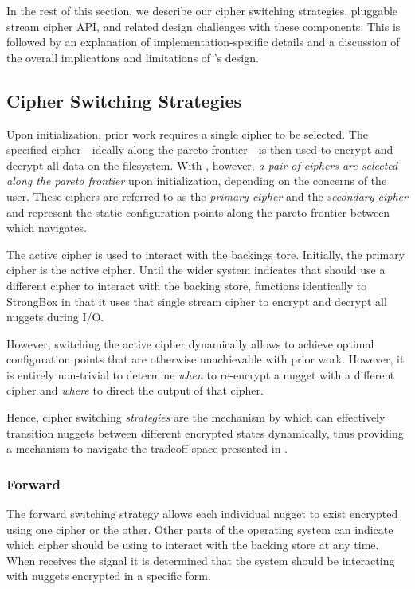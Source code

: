 In the rest of this section, we describe our cipher switching strategies,
pluggable stream cipher API, and related design challenges with these
components. This is followed by an explanation of implementation-specific
details and a discussion of the overall implications and limitations of
\SYSTEM{}'s design.

\subsection{Cipher Switching Strategies}

Upon initialization, prior work requires a single cipher to be selected. The
specified cipher---ideally along the pareto frontier---is then used to encrypt
and decrypt all data on the filesystem. With \SYSTEM{}, however, \emph{a pair of
ciphers are selected along the pareto frontier} upon initialization, depending
on the concerns of the user. These ciphers are referred to as the \emph{primary
cipher} and the \emph{secondary cipher} and represent the static configuration
points along the pareto frontier between which \SYSTEM{} navigates.

The active cipher is used to interact with the backings tore. Initially, the
primary cipher is the active cipher. Until the wider system indicates that
\SYSTEM{} should use a different cipher to interact with the backing store,
\SYSTEM{} functions identically to StrongBox in that it uses that single stream
cipher to encrypt and decrypt all nuggets during I/O.

However, switching the active cipher dynamically allows \SYSTEM{} to achieve
optimal configuration points that are otherwise unachievable with prior work.
However, it is entirely non-trivial to determine \emph{when} to re-encrypt a
nugget with a different cipher and \emph{where} to direct the output of that
cipher.

Hence, cipher switching \emph{strategies} are the mechanism by which \SYSTEM{}
can effectively transition nuggets between different encrypted states
dynamically, thus providing a mechanism to navigate the tradeoff space presented
in
. 

\subsubsection{Forward}

The forward switching strategy allows each individual nugget to exist encrypted
using one cipher or the other. Other parts of the operating system can indicate
which cipher \SYSTEM{} should be using to interact with the backing store at any
time. When \SYSTEM{} receives the signal it is determined that the system should be interacting with nuggets
encrypted in a specific form.

